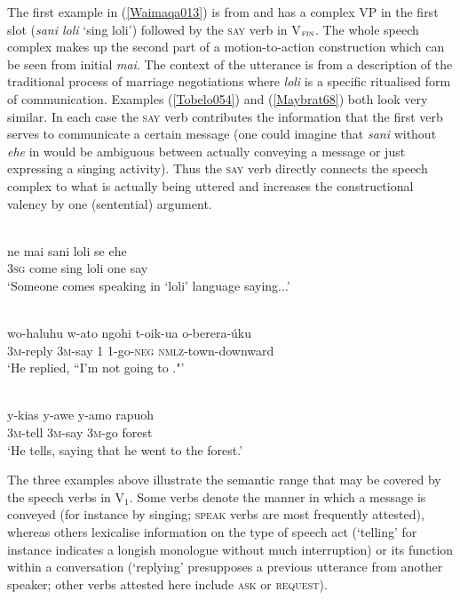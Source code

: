The first example in (\ref{Waimaqa013}) is from  and has a complex VP in the first slot (\textit{sani loli} `sing loli') followed by the \textsc{say} verb in V$_{\textsc{fin}}$. The whole speech complex makes up the second part of a motion-to-action construction which can be seen from initial \textit{mai}. The context of the utterance is from a description of the traditional  process of marriage negotiations where \textit{loli} is a specific ritualised form of communication. Examples (\ref{Tobelo054}) and (\ref{Maybrat68}) both look very similar. In each case the \textsc{say} verb contributes the information that the first verb serves to communicate a certain message (one could imagine that \textit{sani} without \textit{ehe} in  would be ambiguous between actually conveying a message or just expressing a singing activity). Thus the \textsc{say} verb directly connects the speech complex to what is actually being uttered and increases the constructional valency by one (sentential) argument. 

\ea \label{Waimaqa013}
\\
\gll ne mai sani loli se ehe \\
\textsc{3}\textsc{sg} come sing loli one say \\
\glft `Someone comes speaking in `loli' language saying...'\\ 
\z

\ea \label{Tobelo054}
\\
\gll wo-haluhu w-ato ngohi t-oik-ua o-berera-úku \\
\textsc{3}\textsc{m}-reply \textsc{3}\textsc{m}-say \textsc{1} \textsc{1}-go-\textsc{neg} \textsc{nmlz}-town-downward \\
\glft `He replied, ``I'm not going to ."'\\ 
\z

\ea \label{Maybrat68}
\\
\gll y-kias y-awe y-amo rapuoh \\
\textsc{3}\textsc{m}-tell \textsc{3}\textsc{m}-say \textsc{3}\textsc{m}-go forest \\
\glft `He tells, saying that he went to the forest.'\\ 
\z

The three examples above illustrate the semantic range that may be covered by the speech verbs in V$_{1}$. Some verbs denote the manner in which a message is conveyed (for instance by singing; \textsc{speak} verbs are most frequently attested), whereas others lexicalise information on the type of speech act (`telling' for instance indicates a longish monologue without much interruption) or its function within a conversation (`replying' presupposes a previous utterance from another speaker; other verbs attested here include \textsc{ask} or \textsc{request}).

